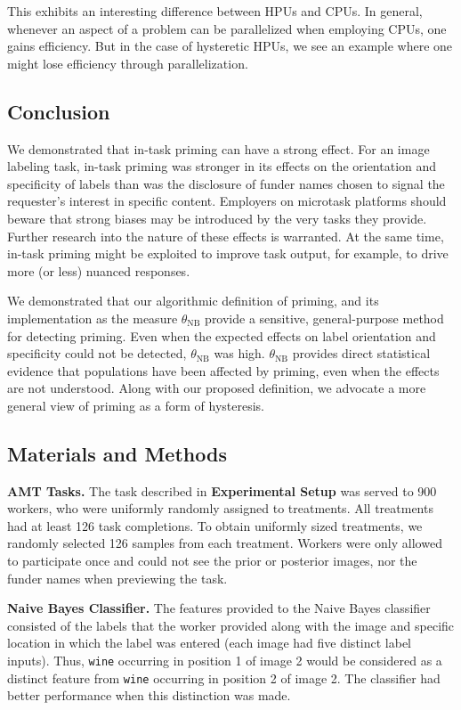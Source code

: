 \documentclass[a4paper]{report}
\begin{document}
This exhibits an interesting difference between HPUs and CPUs.  In general,
whenever an aspect of a problem can be parallelized when employing CPUs, one
gains efficiency.  But in the case of hysteretic HPUs, we see an 
example where one might lose efficiency through parallelization.

\subsection*{Conclusion}
We demonstrated that in-task priming can have a strong effect.  
For an image labeling task, in-task priming was stronger in its effects on 
the orientation and specificity of labels than was the disclosure of funder 
names chosen to signal the requester's interest in specific content.
Employers on microtask platforms should 
beware that strong biases may be introduced by the very tasks they provide.
Further research into the nature of these effects is warranted.  At the 
same time, in-task priming might be exploited to improve task output, for 
example, to drive more (or less) nuanced responses.

We demonstrated that our algorithmic definition of priming, and its 
implementation as the measure $\theta_\text{NB}$ provide a sensitive,
general-purpose method for detecting priming.  Even when the expected effects 
on label orientation and specificity could not be detected, $\theta_\text{NB}$ 
was high.  $\theta_\text{NB}$ provides direct statistical evidence that 
populations have been affected by priming, even when the effects are not 
understood. Along with our proposed definition, we advocate a more general 
view of priming as a form of hysteresis.

\subsection*{Materials and Methods}

\textbf{AMT Tasks.} The task described in \textbf{Experimental Setup}
was served to 900 workers, who were uniformly randomly assigned to
treatments.  All treatments had at least 126 task completions.  To obtain 
uniformly sized treatments, we randomly selected 126 samples from each 
treatment. Workers were
only allowed to participate once and could not see the prior or posterior 
images, nor the funder names when previewing the task.

\textbf{Naive Bayes Classifier.}
The features provided to the Naive Bayes classifier consisted of the labels
that the worker provided along with the image and specific location in which 
the label was entered
(each image had five distinct label inputs).  Thus, \texttt{wine} occurring in 
position 1 of image 2 would be considered as a distinct feature from 
\texttt{wine} occurring in position 2 of image 2. The classifier 
had better performance when this distinction was made.
\end{document}
